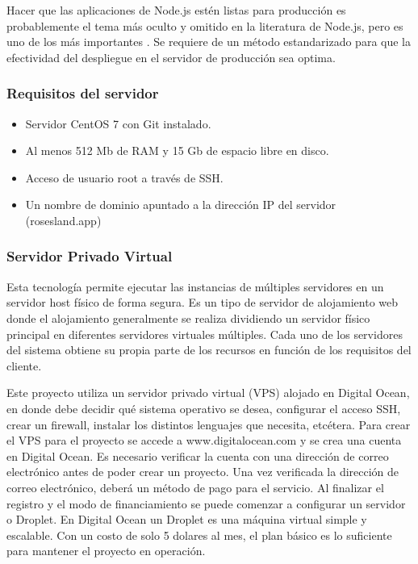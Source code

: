 Hacer que las aplicaciones de Node.js estén listas para producción es probablemente el tema más oculto y omitido en la literatura de Node.js, pero es uno de los más importantes \cite{mardan}. Se requiere de un método estandarizado para que la efectividad del despliegue en el servidor de producción sea optima.

\subsubsection{Requisitos del servidor}

\begin{itemize}
  \item Servidor CentOS 7 con Git instalado.
  \item Al menos 512 Mb de RAM y 15 Gb de espacio libre en disco.
  \item Acceso de usuario root a través de SSH.
  \item Un nombre de dominio apuntado a la dirección IP del servidor (rosesland.app)
  
\end{itemize}

\subsubsection{Servidor Privado Virtual}
Esta tecnología permite ejecutar las instancias de múltiples servidores en un servidor host físico de forma segura. Es un tipo de servidor de alojamiento web donde el alojamiento generalmente se realiza dividiendo un servidor físico principal en diferentes servidores virtuales múltiples. Cada uno de los servidores del sistema obtiene su propia parte de los recursos en función de los requisitos del cliente.
\vspace{0.8cm}

Este proyecto utiliza un servidor privado virtual (VPS) alojado en Digital Ocean, en donde debe decidir qué sistema operativo se desea, configurar el acceso SSH, crear un firewall, instalar los distintos lenguajes que necesita, etcétera. Para crear el VPS para el proyecto se accede a www.digitalocean.com y se crea una cuenta en Digital Ocean. Es necesario verificar la cuenta con una dirección de correo electrónico antes de poder crear un proyecto. Una vez verificada la dirección de correo electrónico, deberá un método de pago para el servicio. Al finalizar el registro y el modo de financiamiento se puede comenzar a configurar un servidor o Droplet. En Digital Ocean un Droplet es una máquina virtual simple y escalable. Con un costo de solo 5 dolares al mes, el plan básico es lo suficiente para mantener el proyecto en operación.
\vspace{0.8cm}

